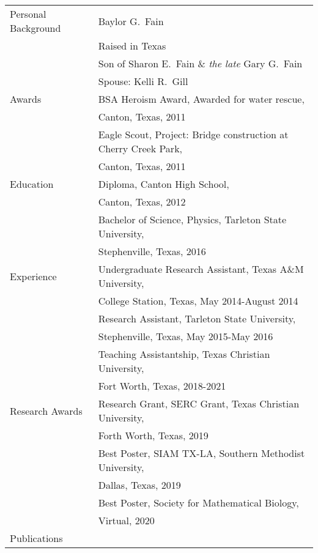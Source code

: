 \begin{tabular}{ll}
Personal Background 	& Baylor G.\ Fain \\
						& Raised in Texas\\
						& Son of Sharon E.\ Fain \& \emph{the late} Gary G.\ Fain \\
    					& Spouse: Kelli R.\ Gill \\[5mm]
Awards                  & BSA Heroism Award, Awarded for water rescue, \\   & \hspace{10mm} Canton, Texas, 2011 \\
                        & Eagle Scout, Project: Bridge construction at Cherry Creek Park,\\   & \hspace{10mm} Canton, Texas, 2011 \\
Education				& Diploma, Canton High School, \\  & \hspace{10mm} Canton, Texas, 2012 \\
					    & Bachelor of Science, Physics, Tarleton State University, \\  & \hspace{10mm} Stephenville, Texas, 2016 \\
Experience			    & Undergraduate Research Assistant, Texas A\&M University, \\	 & \hspace{10mm} College Station, Texas, May 2014-August 2014 \\
                        & Research Assistant, Tarleton State University, \\	 & \hspace{10mm} Stephenville, Texas, May 2015-May 2016 \\
						& Teaching Assistantship, Texas Christian University, \\ 	 & \hspace{10mm} Fort Worth, Texas, 2018-2021 \\
Research Awards         & Research Grant, SERC Grant, Texas Christian University,\\   & \hspace{10mm} Forth Worth, Texas, 2019 \\
                        & Best Poster, SIAM TX-LA, Southern Methodist University,\\   & \hspace{10mm} Dallas, Texas, 2019 \\
                        & Best Poster, Society for Mathematical Biology,\\   & \hspace{10mm} Virtual, 2020 \\
Publications 
\end{tabular}
